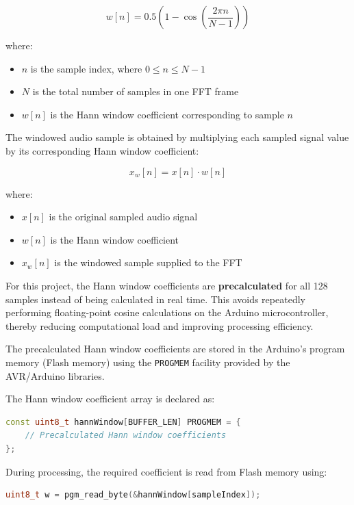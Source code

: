 \documentclass{article}
\begin{document}
\begin{center}
\[
w[n] =
0.5
\left(
1 -
\cos
\left(
\frac{2\pi n}{N-1}
\right)
\right)
\]

where:

\begin{itemize}
    \item $n$ is the sample index, where $0 \leq n \leq N-1$
    \item $N$ is the total number of samples in one FFT frame
    \item $w[n]$ is the Hann window coefficient corresponding to sample $n$
\end{itemize}

The windowed audio sample is obtained by multiplying each sampled signal value by its corresponding Hann window coefficient:

\[
x_w[n] = x[n] \cdot w[n]
\]

where:

\begin{itemize}
    \item $x[n]$ is the original sampled audio signal
    \item $w[n]$ is the Hann window coefficient
    \item $x_w[n]$ is the windowed sample supplied to the FFT
\end{itemize}

For this project, the Hann window coefficients are \textbf{precalculated} for all 128 samples instead of being calculated in real time. This avoids repeatedly performing floating-point cosine calculations on the Arduino microcontroller, thereby reducing computational load and improving processing efficiency.

The precalculated Hann window coefficients are stored in the Arduino's program memory (Flash memory) using the \texttt{PROGMEM} facility provided by the AVR/Arduino libraries.

The Hann window coefficient array is declared as:

\begin{lstlisting}[language=C++]
const uint8_t hannWindow[BUFFER_LEN] PROGMEM = {
    // Precalculated Hann window coefficients
};
\end{lstlisting}

During processing, the required coefficient is read from Flash memory using:

\begin{lstlisting}[language=C++]
uint8_t w = pgm_read_byte(&hannWindow[sampleIndex]);
\end{lstlisting}


\end{center}
\end{document}
